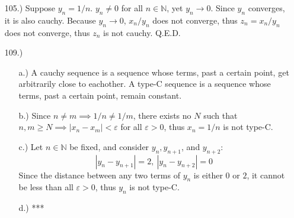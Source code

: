 \documentclass[12pt]{article}
\newcommand{\vertb}[1]{\left\vert#1\right\vert}
\newcommand{\e}{\varepsilon}
\begin{document}
\begin{itemize}






    
    \item [105.)] Suppose $y_n=1/n$. $y_n\ne0$ for all $n\in\mathbb{N}$, yet $y_n\to0$. Since $y_n$ converges, it is also cauchy. Because $y_n\to0$, $x_n/y_n$ does not converge, thus $z_n=x_n/y_n$ does not converge, thus $z_n$ is not cauchy. Q.E.D.




    \item [109.)] \begin{itemize}
        \item [a.)] A cauchy sequence is a sequence whose terms, past a certain point, get arbitrarily close to eachother. A type-C sequence is a sequence whose terms, past a certain point, remain constant.

        \item [b.)] Since $n\neq m\implies1/n\ne1/m$, there exists no $N$ such that $n,m\geq N\implies\vertb{x_n-x_m}<\e$ for all $\e>0$, thus $x_n=1/n$ is not type-C.

        \item [c.)] Let $n\in\mathbb{N}$ be fixed, and consider $y_n,y_{n+1}$, and $y_{n+2}$:
        \[\vertb{y_n-y_{n+1}}=2,\ \vertb{y_n-y_{n+2}}=0\]
        Since the distance between any two terms of $y_n$ is either $0$ or $2$, it cannot be less than all $\e>0$, thus $y_n$ is not type-C.

        \item [d.)] ***


\end{itemize}
\end{itemize}
\end{document}
